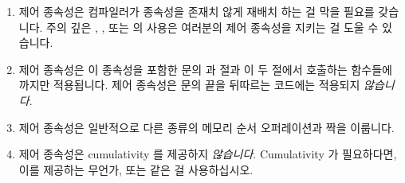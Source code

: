 \begin{enumerate}
\item	제어 종속성은 컴파일러가 종속성을 존재치 않게 재배치 하는 걸 막을
	필요를 갖습니다.
	주의 깊은 , , 또는
	 의 사용은 여러분의 제어 종속성을 지키는 걸 도울 수
	있습니다.

\item	제어 종속성은 이 종속성을 포함한  문의  과 
	절과 이 두 절에서 호출하는 함수들에까지만 적용됩니다.
	제어 종속성은  문의 끝을 뒤따르는 코드에는 적용되지
	\emph{않습니다}.

\item	제어 종속성은 일반적으로 다른 종류의 메모리 순서 오퍼레이션과 짝을
	이룹니다.

\item	제어 종속성은 cumulativity 를 제공하지 \emph{않습니다}.
	Cumulativity 가 필요하다면, 이를 제공하는 무언가,
	 또는  같은 걸 사용하십시오.

\end{enumerate}

